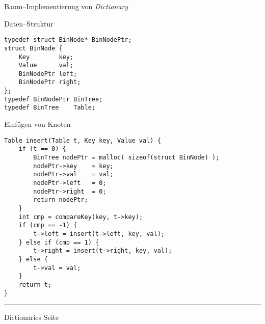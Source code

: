 \begin{slide}{}
\normalsize

\begin{center}
Baum--Implementierung von \textsl{Dictionary}
\end{center}
\vspace*{0.5cm}

\footnotesize
Daten--Struktur
\begin{verbatim}
typedef struct BinNode* BinNodePtr;
struct BinNode {
    Key        key;
    Value      val;
    BinNodePtr left;
    BinNodePtr right;
};
typedef BinNodePtr BinTree;
typedef BinTree    Table;
\end{verbatim}
Einf\"ugen von Knoten
\begin{verbatim}
Table insert(Table t, Key key, Value val) {
    if (t == 0) {
        BinTree nodePtr = malloc( sizeof(struct BinNode) );
        nodePtr->key    = key;
        nodePtr->val    = val;
        nodePtr->left   = 0;
        nodePtr->right  = 0;
        return nodePtr;
    }
    int cmp = compareKey(key, t->key);
    if (cmp == -1) {
        t->left = insert(t->left, key, val);
    } else if (cmp == 1) {
        t->right = insert(t->right, key, val);
    } else {
        t->val = val;
    }
    return t;
}
\end{verbatim}


\vspace*{\fill}
\tiny \addtocounter{mypage}{1}
\rule{17cm}{1mm}
Dictionaries  \hspace*{\fill} Seite 
\end{slide}


